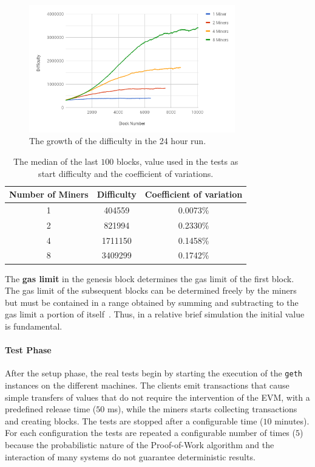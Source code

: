 \begin{figure}[h!]
  \begin{center}
    \includegraphics[width=0.8\textwidth]{./res/img/start_difficulty_all.png}
    \caption{The growth of the difficulty in the 24 hour run.}
    \label{fig:start_difficulty_raw}
  \end{center}
\end{figure}

\begin{table}[h!]
  \begin{center}
    \begin{tabular}{c | c | c}
      Number of Miners & Difficulty & Coefficient of variation \\
      \hline
      1 &  404559 & 0.0073\% \\
      2 &  821994 & 0.2330\%\\
      4 & 1711150 & 0.1458\%\\
      8 & 3409299 & 0.1742\%\\
    \end{tabular}
    \caption{The median of the last $100$ blocks, value used in the tests as
    start difficulty and the coefficient of variations.}
    \label{table:start-difficulty}
  \end{center}
\end{table}


The \textbf{gas limit} in the genesis block determines the gas limit of the
first block. The gas limit of the subsequent blocks can be determined freely by
the miners but must be contained in a range obtained by summing and subtracting
to the gas limit a portion of itself~\cite{wood2018ethereum}. Thus, in a
relative brief simulation the initial value is fundamental.

\paragraph{Test Phase}
After the setup phase, the real tests begin by starting the execution of the
\texttt{geth} instances on the different machines. The clients emit transactions
that cause simple transfers of values that do not require the intervention of
the EVM, with a predefined release time ($50$ ms), while the miners starts
collecting transactions and creating blocks. The tests are stopped after a
configurable time ($10$ minutes). For each configuration the tests are repeated
a configurable number of times ($5$) because the probabilistic nature of the
Proof-of-Work algorithm and the interaction of many systems do not guarantee
deterministic results.


